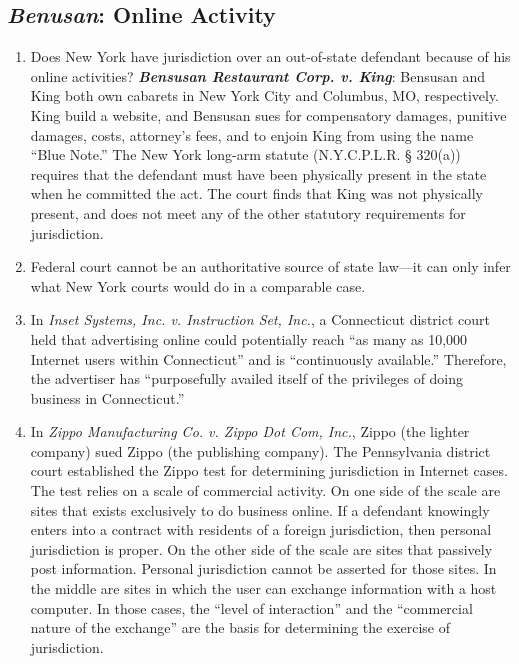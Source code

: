\subsection{\emph{Benusan}: Online Activity}

\begin{enumerate}
    \item Does New York have jurisdiction over an out-of-state defendant because of his online activities? \textbf{\emph{Bensusan Restaurant Corp. v. King}}: Bensusan and King both own cabarets in New York City and Columbus, MO, respectively. King build a website, and Bensusan sues for compensatory damages, punitive damages, costs, attorney's fees, and to enjoin King from using the name ``Blue Note.'' The New York long-arm statute (N.Y.C.P.L.R. § 320(a)) requires that the defendant must have been physically present in the state when he committed the act. The court finds that King was not physically present, and does not meet any of the other statutory requirements for jurisdiction.
    \item Federal court cannot be an authoritative source of state law---it can only infer what New York courts would do in a comparable case.
    \item In \emph{Inset Systems, Inc. v. Instruction Set, Inc.}, a Connecticut district court held that advertising online could potentially reach ``as many as 10,000 Internet users within Connecticut'' and is ``continuously available.'' Therefore, the advertiser has ``purposefully availed itself of the privileges of doing business in Connecticut.''
    \item In \emph{Zippo Manufacturing Co. v. Zippo Dot Com, Inc.}, Zippo (the lighter company) sued Zippo (the publishing company). The Pennsylvania district court established the Zippo test for determining jurisdiction in Internet cases. The test relies on a scale of commercial activity. On one side of the scale are sites that exists exclusively to do business online. If a defendant knowingly enters into a contract with residents of a foreign jurisdiction, then personal jurisdiction is proper. On the other side of the scale are sites that passively post information. Personal jurisdiction cannot be asserted for those sites. In the middle are sites in which the user can exchange information with a host computer. In those cases, the ``level of interaction'' and the ``commercial nature of the exchange'' are the basis for determining the exercise of jurisdiction. 
\end{enumerate}

